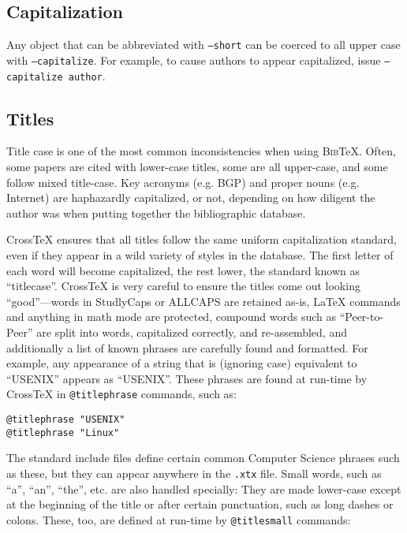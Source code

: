 \documentclass{article}
\newcommand{\XTX}{Cross\TeX}
\newcommand{\BibTeX}{\textsc{Bib}\TeX}
\begin{document}
\subsection{Capitalization}

Any object that can be abbreviated with \texttt{--short} can be coerced to
all upper case with \texttt{--capitalize}.  For example, to cause authors
to appear capitalized, issue \texttt{--capitalize author}.

\subsection{Titles}

Title case is one of the most common inconsistencies when using
\BibTeX{}. Often, some papers are cited with lower-case titles, some are all
upper-case, and some follow mixed title-case. Key acronyms (e.g. BGP)
and proper nouns (e.g. Internet) are haphazardly capitalized, or not,
depending on how diligent the author was when putting together the
bibliographic database.

\XTX{} ensures that all titles follow the same uniform capitalization
standard, even if they appear in a wild variety of styles in the database.
The first letter of each word will become capitalized, the rest lower,
the standard known as ``titlecase''.  \XTX{} is very careful to ensure
the titles come out looking ``good''---words in StudlyCaps or ALLCAPS are
retained as-is, \LaTeX{} commands and anything in math mode are protected,
compound words such as ``Peer-to-Peer'' are split into words, capitalized
correctly, and re-assembled, and additionally a list of known phrases are
carefully found and formatted.  For example, any appearance of a string
that is (ignoring case) equivalent to ``USENIX'' appears as ``USENIX''.
These phrases are found at run-time by \XTX{} in \texttt{@titlephrase}
commands, such as:

\begin{small}\begin{verbatim}
@titlephrase "USENIX"
@titlephrase "Linux"
\end{verbatim}\end{small}

The standard include files define certain common Computer Science phrases
such as these, but they can appear anywhere in the \texttt{.xtx} file.
Small words, such as ``a'', ``an'', ``the'', etc. are also handled
specially: They are made lower-case except at the beginning of the title
or after certain punctuation, such as long dashes or colons.  These,
too, are defined at run-time by \texttt{@titlesmall} commands:
\end{document}
